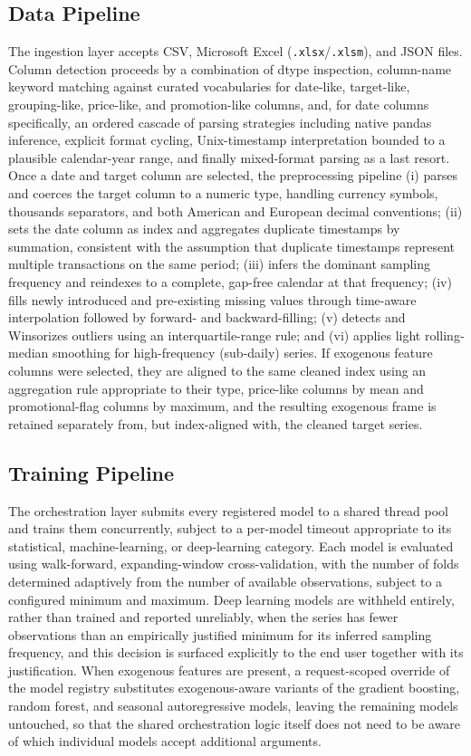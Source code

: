 \subsection{Data Pipeline}
\label{subsec:data-pipeline}
The ingestion layer accepts CSV, Microsoft Excel (\texttt{.xlsx}/\texttt{.xlsm}), and JSON files. Column detection proceeds by a combination of dtype inspection, column-name keyword matching against curated vocabularies for date-like, target-like, grouping-like, price-like, and promotion-like columns, and, for date columns specifically, an ordered cascade of parsing strategies including native pandas inference, explicit format cycling, Unix-timestamp interpretation bounded to a plausible calendar-year range, and finally mixed-format parsing as a last resort. Once a date and target column are selected, the preprocessing pipeline (i) parses and coerces the target column to a numeric type, handling currency symbols, thousands separators, and both American and European decimal conventions; (ii) sets the date column as index and aggregates duplicate timestamps by summation, consistent with the assumption that duplicate timestamps represent multiple transactions on the same period; (iii) infers the dominant sampling frequency and reindexes to a complete, gap-free calendar at that frequency; (iv) fills newly introduced and pre-existing missing values through time-aware interpolation followed by forward- and backward-filling; (v) detects and Winsorizes outliers using an interquartile-range rule; and (vi) applies light rolling-median smoothing for high-frequency (sub-daily) series. If exogenous feature columns were selected, they are aligned to the same cleaned index using an aggregation rule appropriate to their type, price-like columns by mean and promotional-flag columns by maximum, and the resulting exogenous frame is retained separately from, but index-aligned with, the cleaned target series.

\subsection{Training Pipeline}
The orchestration layer submits every registered model to a shared thread pool and trains them concurrently, subject to a per-model timeout appropriate to its statistical, machine-learning, or deep-learning category. Each model is evaluated using walk-forward, expanding-window cross-validation, with the number of folds determined adaptively from the number of available observations, subject to a configured minimum and maximum. Deep learning models are withheld entirely, rather than trained and reported unreliably, when the series has fewer observations than an empirically justified minimum for its inferred sampling frequency, and this decision is surfaced explicitly to the end user together with its justification. When exogenous features are present, a request-scoped override of the model registry substitutes exogenous-aware variants of the gradient boosting, random forest, and seasonal autoregressive models, leaving the remaining models untouched, so that the shared orchestration logic itself does not need to be aware of which individual models accept additional arguments.

